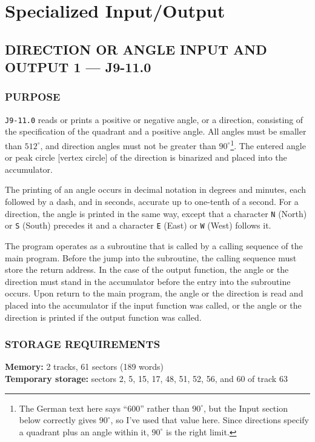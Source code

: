 \section{Specialized Input/Output}
\subsection*{DIRECTION OR ANGLE INPUT AND OUTPUT 1 --- J9-11.0}

\subsubsection*{PURPOSE}
\texttt{J9-11.0} reads or prints a positive or negative angle, or a direction, consisting of the specification of the quadrant and a positive angle. All angles must be smaller than $512^\circ$, and direction angles must not be greater than $90^\circ$\footnote{The German text here says ``600'' rather than $90^\circ$, but the Input section below correctly gives $90^\circ$, so I've used that value here. Since directions specify a quadrant plus an angle within it, $90^\circ$ is the right limit.}. The entered angle or peak circle [vertex circle] of the direction is binarized and placed into the accumulator.

The printing of an angle occurs in decimal notation in degrees and minutes, each followed by a dash, and in seconds, accurate up to one-tenth of a second. For a direction, the angle is printed in the same way, except that a character \texttt{N} (North) or \texttt{S} (South) precedes it and a character \texttt{E} (East) or \texttt{W} (West) follows it.

The program operates as a subroutine that is called by a calling sequence of the main program. Before the jump into the subroutine, the calling sequence must store the return address. In the case of the output function, the angle or the direction must stand in the accumulator before the entry into the subroutine occurs. Upon return to the main program, the angle or the direction is read and placed into the accumulator if the input function was called, or the angle or the direction is printed if the output function was called.

\subsubsection*{STORAGE REQUIREMENTS}
\textbf{Memory:} 2 tracks, 61 sectors (189 words) \\
\textbf{Temporary storage:} sectors 2, 5, 15, 17, 48, 51, 52, 56, and 60 of track 63

